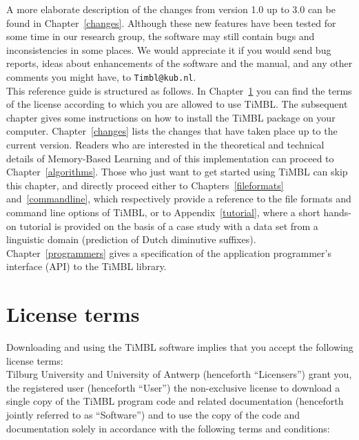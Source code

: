 \documentclass{report}
\begin{document}
A more elaborate description of the changes from version 1.0 up to 3.0
can be found in Chapter~\ref{changes}. Although these new features
have been tested for some time in our research group, the software may
still contain bugs and inconsistencies in some places. We would
appreciate it if you would send bug reports, ideas about enhancements
of the software and the manual, and any other comments you might have,
to {\tt Timbl@kub.nl}.\\

This reference guide is structured as follows. In
Chapter~\ref{license} you can find the terms of the license according
to which you are allowed to use TiMBL. The subsequent chapter gives
some instructions on how to install the TiMBL package on your
computer. Chapter~\ref{changes} lists the changes that have taken
place up to the current version. Readers who are interested in the
theoretical and technical details of Memory-Based Learning and of this
implementation can proceed to Chapter~\ref{algorithms}. Those who
just want to get started using TiMBL can skip this chapter, and
directly proceed either to Chapters~\ref{fileformats}
and~\ref{commandline}, which respectively provide a reference to the
file formats and command line options of TiMBL, or to
Appendix~\ref{tutorial}, where a short hands-on tutorial is provided
on the basis of a case study with a data set from a linguistic domain
(prediction of Dutch diminutive suffixes). Chapter~\ref{programmers}
gives a specification of the application programmer's interface (API)
to the TiMBL library.

\chapter{License terms}
\label{license}

Downloading and using the TiMBL software implies that you accept the
following license terms:\\

Tilburg University and University of Antwerp (henceforth
``Licensers'') grant you, the registered user (henceforth ``User'')
the non-exclusive license to download a single copy of the TiMBL
program code and related documentation (henceforth jointly referred to
as ``Software'') and to use the copy of the code and documentation
solely in accordance with the following terms and conditions:
\end{document}
